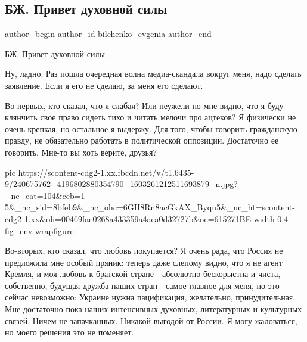  
 
 
 
 
 
\subsection{БЖ. Привет духовной силы}
\label{sec:29_08_2021.fb.bilchenko_evgenia.1.privet_duhovnoj_sily}
 
\ifcmt
 author_begin
   author_id bilchenko_evgenia
 author_end
\fi

БЖ. Привет духовной силы.

Ну, ладно. Раз пошла очередная волна  медиа-скандала вокруг меня, надо сделать
заявление. Если я его не сделаю, за меня его сделают. 

Во-первых, кто сказал, что я слабая? Или неужели по мне видно, что я буду
клянчить свое право сидеть тихо и читать мелочи про ацтеков? Я физически не
очень крепкая, но остальное я выдержу. Для того, чтобы говорить гражданскую
правду, не обязательно работать в политической оппозиции. Достаточно ее
говорить. Мне-то вы хоть верите, друзья?

\ifcmt
  pic https://scontent-cdg2-1.xx.fbcdn.net/v/t1.6435-9/240675762_4196802880354790_1603261212511693879_n.jpg?_nc_cat=104&ccb=1-5&_nc_sid=8bfeb9&_nc_ohc=6GH8Rn8acGkAX_Byqn5&_nc_ht=scontent-cdg2-1.xx&oh=00469fae0268a433359a4aea0d32727b&oe=615271BE
  width 0.4
	fig_env wrapfigure
\fi

Во-вторых, кто сказал, что любовь покупается? Я очень рада, что Россия не
предложила мне особый пряник: теперь даже слепому видно, что я не агент Кремля,
и моя любовь к братской стране - абсолютно бескорыстна и чиста, собственно,
будущая дружба наших стран - самое главное для меня, но это сейчас невозможно:
Украине нужна пацификация, желательно, принудительная. Мне достаточно пока
наших интенсивных духовных, литературных и культурных связей. Ничем не
запачканных. Никакой выгодой от России. Я могу жаловаться, но моего решения это
не поменяет.

